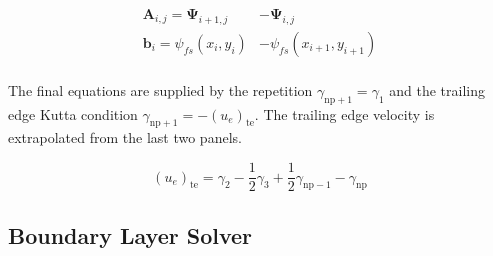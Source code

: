 \documentclass{article}
\begin{document}
\begin{align}
    \mathbf{A}_{i,j} = \boldsymbol{\Psi}_{i+1,j} &- \boldsymbol{\Psi}_{i,j} \\
    \boldsymbol{b}_i = \psi_{fs}(x_i, y_i) &- \psi_{fs}(x_{i+1}, y_{i+1}) \\
\end{align}

The final equations are supplied by the repetition $\gamma_{\text{np}+1} = \gamma_1$ and the trailing edge Kutta condition $\gamma_{\text{np}+1} = -(u_e)_{\text{te}}$.
The trailing edge velocity is extrapolated from the last two panels.

\begin{equation}
    (u_e)_{\text{te}} = \gamma_2 - \frac{1}{2}\gamma_3 + \frac{1}{2}\gamma_{\text{np} - 1} - \gamma_{\text{np}}
\end{equation}

\subsection{Boundary Layer Solver}
\end{document}
